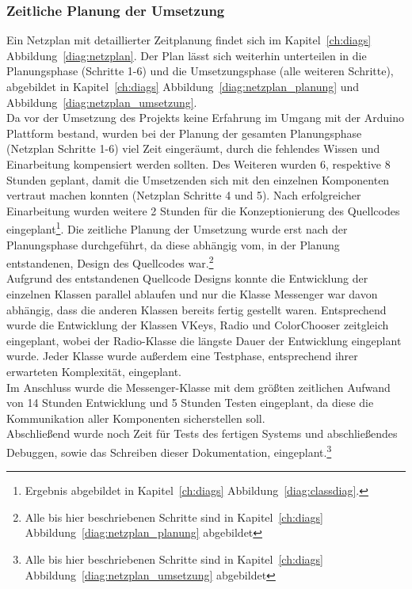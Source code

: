 \documentclass[a4paper, 11pt]{scrartcl}
\begin{document}
\subsubsection{Zeitliche Planung der Umsetzung}
Ein Netzplan mit detaillierter Zeitplanung findet sich im Kapitel~\ref{ch:diags} Abbildung~\ref{diag:netzplan}. Der Plan lässt sich weiterhin unterteilen in die
Planungsphase (Schritte 1-6) und die Umsetzungsphase (alle weiteren Schritte), abgebildet in Kapitel~\ref{ch:diags} Abbildung~\ref{diag:netzplan_planung} 
und Abbildung~\ref{diag:netzplan_umsetzung}.
\\
Da vor der Umsetzung des Projekts keine Erfahrung im Umgang mit der Arduino Plattform bestand, wurden bei der Planung der gesamten Planungsphase (Netzplan Schritte 1-6) 
viel Zeit eingeräumt, durch die fehlendes Wissen und Einarbeitung kompensiert werden sollten. Des Weiteren wurden 6, respektive 8 Stunden geplant, damit die 
Umsetzenden sich mit den einzelnen Komponenten vertraut machen konnten (Netzplan Schritte 4 und 5). Nach erfolgreicher Einarbeitung wurden weitere 2 Stunden
für die Konzeptionierung des Quellcodes eingeplant\footnote{Ergebnis abgebildet in Kapitel~\ref{ch:diags} Abbildung~\ref{diag:classdiag}.}. Die zeitliche 
Planung der Umsetzung wurde erst nach der Planungsphase durchgeführt, da diese abhängig vom, in der Planung entstandenen, Design des Quellcodes war.\footnote{Alle bis hier 
beschriebenen Schritte sind in Kapitel~\ref{ch:diags} Abbildung~\ref{diag:netzplan_planung} abgebildet}
\\
Aufgrund des entstandenen Quellcode Designs konnte die Entwicklung der einzelnen Klassen parallel ablaufen und nur die Klasse \glqq Messenger\grqq{} war davon abhängig,
dass die anderen Klassen bereits fertig gestellt waren. Entsprechend wurde die Entwicklung der Klassen \glqq VKeys\grqq , \glqq Radio\grqq{} und \glqq ColorChooser\grqq{}
zeitgleich eingeplant, wobei der Radio-Klasse die längste Dauer der Entwicklung eingeplant wurde. Jeder Klasse wurde außerdem eine Testphase, entsprechend ihrer erwarteten
Komplexität, eingeplant.
\\
Im Anschluss wurde die Messenger-Klasse mit dem größten zeitlichen Aufwand von 14 Stunden Entwicklung und 5 Stunden Testen eingeplant, da diese die Kommunikation
aller Komponenten sicherstellen soll.
\\
Abschließend wurde noch Zeit für Tests des fertigen Systems und abschließendes Debuggen, sowie das Schreiben dieser Dokumentation, eingeplant.\footnote{Alle bis hier 
beschriebenen Schritte sind in Kapitel~\ref{ch:diags} Abbildung~\ref{diag:netzplan_umsetzung} abgebildet}
\end{document}
